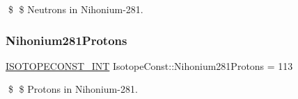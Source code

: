 \$ \$ Neutrons in Nihonium-\/281. \mbox{\label{group___isotope_const-_nihonium-_nh281_ga787c9ce91d1957efe05fd95bd000c76c}} 
\subsubsection{\texorpdfstring{Nihonium281\+Protons}{Nihonium281Protons}}
{\footnotesize\ttfamily \mbox{\hyperlink{group___isotope_const-_macros_ga5f18360b3e99483a35c32d789e62621c}{I\+S\+O\+T\+O\+P\+E\+C\+O\+N\+S\+T\+\_\+\+I\+NT}} Isotope\+Const\+::\+Nihonium281\+Protons = 113}

\$ \$ Protons in Nihonium-\/281. 
